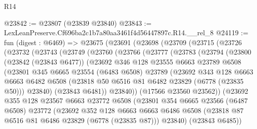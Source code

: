 \begin{lexlean}{R14}
\begin{coremodule}
@23842 := @23807 (@23839 @23840)
@23843 := LexLeanPreserve.Cf696ba2c1b7a80aa3461f4d56447897c.R14.__rel_8
@24119 := fun (digest : @6469) =>
  @23675
    (@23691
      (@23698
        (@23709
          (@23715
            (@23726
              (@23732
                (@23743
                  (@23749
                    (@23760
                      (@23766
                        (@23777
                          (@23783
                            (@23794
                              (@23800
                                (@23842 (@23843 @6477))
                                (@23692
                                  @346
                                  @128
                                  @23555
                                  @6663
                                  @23789
                                  @6508
                                  (@23801
                                    @345
                                    @6665
                                    @23554
                                    (@6483 @6508)
                                    @23789
                                    (@23692
                                      @343
                                      @128
                                      @6663
                                      @6663
                                      @6482
                                      @6508
                                      (@23818 @50 @6516 @81 @6482 @23829 (@6778 (@23835 @50)))
                                      @23840)
                                    (@23843 @6481))
                                  @23840))
                              (@17566 @23560 @23562))
                            (@23692
                              @355
                              @128
                              @23567
                              @6663
                              @23772
                              @6508
                              (@23801
                                @354
                                @6665
                                @23566
                                (@6487 @6508)
                                @23772
                                (@23692
                                  @352
                                  @128
                                  @6663
                                  @6663
                                  @6486
                                  @6508
                                  (@23818 @87 @6516 @81 @6486 @23829 (@6778 (@23835 @87)))
                                  @23840)
                                (@23843 @6485))

\end{coremodule}
\end{lexlean}

